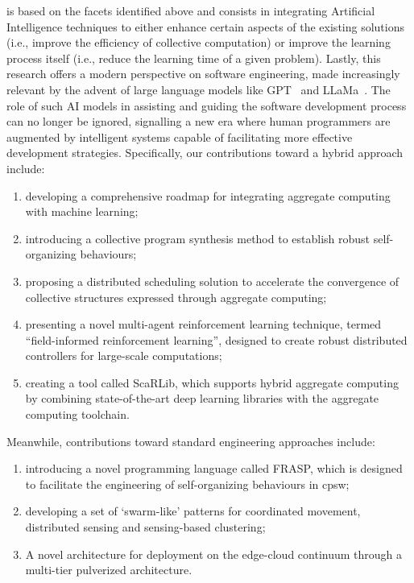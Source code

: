 \begin{refsection}
 is based on the facets identified above and consists in
 integrating Artificial Intelligence techniques 
 to either enhance certain aspects of the existing solutions (i.e., improve the efficiency of collective computation) or improve the learning process itself (i.e., reduce the learning time of a given problem).
% 
Lastly, this research offers a modern perspective on software engineering, 
 made increasingly relevant by the advent of large language models like GPT~\cite{floridi2020gpt} and LLaMa~\cite{touvron2023llama}. 
 The role of such AI models in assisting and guiding the software development process can no longer be ignored, 
 signalling a new era where human programmers are augmented by intelligent systems capable of facilitating more effective development strategies.
Specifically, our contributions toward a hybrid approach include:
\begin{enumerate}
    \item developing a comprehensive roadmap for integrating aggregate computing with machine learning;
    \item introducing a collective program synthesis method to establish robust self-organizing behaviours;
    \item proposing a distributed scheduling solution to accelerate the convergence of collective structures expressed through aggregate computing;
    \sloppy
    \item presenting a novel multi-agent reinforcement learning technique, termed ``field-informed reinforcement learning'', designed to create robust distributed controllers for large-scale computations;
    \item creating a tool called ScaRLib, which supports hybrid aggregate computing by combining state-of-the-art deep learning libraries with the aggregate computing toolchain.
\end{enumerate}
Meanwhile, contributions toward standard engineering approaches include:
\begin{enumerate}
    \item introducing a novel programming language called FRASP, 
    which is designed to facilitate the engineering of self-organizing behaviours in \ac{cpsw};
    \item developing a set of `swarm-like' patterns for coordinated movement, distributed sensing and sensing-based clustering;
    \item A novel architecture for deployment on the edge-cloud continuum through a multi-tier pulverized architecture.
\end{enumerate}

\end{refsection}
